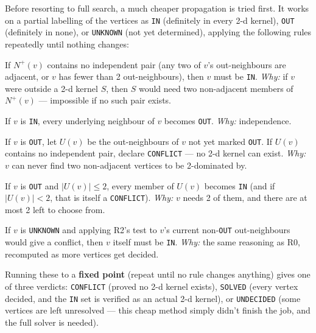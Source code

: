 \documentclass[11pt]{article}
\theoremstyle{plain}
\theoremstyle{definition}
\theoremstyle{remark}
\begin{document}
Before resorting to full search, a much cheaper propagation is tried first. It works
on a partial labelling of the vertices as \texttt{IN} (definitely in every 2-d kernel),
\texttt{OUT} (definitely in none), or \texttt{UNKNOWN} (not yet determined), applying
the following rules repeatedly until nothing changes:

\begin{description}[nosep,leftmargin=2.3cm,style=nextline]
\item[R0 (forced-in)] If $N^+(v)$ contains no independent pair (any two of $v$'s
out-neighbours are adjacent, or $v$ has fewer than 2 out-neighbours), then $v$ must be
\texttt{IN}. \emph{Why:} if $v$ were outside a 2-d kernel $S$, then $S$ would need two
non-adjacent members of $N^+(v)$ — impossible if no such pair exists.
\item[R1 (spread-out)] If $v$ is \texttt{IN}, every underlying neighbour of $v$ becomes
\texttt{OUT}. \emph{Why:} independence.
\item[R2 (conflict-check)] If $v$ is \texttt{OUT}, let $U(v)$ be the out-neighbours of
$v$ not yet marked \texttt{OUT}. If $U(v)$ contains no independent pair, declare
\texttt{CONFLICT} — no 2-d kernel can exist. \emph{Why:} $v$ can never find two
non-adjacent vertices to be 2-dominated by.
\item[R3 (forced-in by scarcity)] If $v$ is \texttt{OUT} and $|U(v)| \le 2$, every
member of $U(v)$ becomes \texttt{IN} (and if $|U(v)| < 2$, that is itself a
\texttt{CONFLICT}). \emph{Why:} $v$ needs 2 of them, and there are at most 2 left to
choose from.
\item[R4 (forced-in by the same test, on the fly)] If $v$ is \texttt{UNKNOWN} and
applying R2's test to $v$'s current non-\texttt{OUT} out-neighbours would give a
conflict, then $v$ itself must be \texttt{IN}. \emph{Why:} the same reasoning as R0,
recomputed as more vertices get decided.
\end{description}

Running these to a \textbf{fixed point} (repeat until no rule changes anything) gives
one of three verdicts: \texttt{CONFLICT} (proved no 2-d kernel exists), \texttt{SOLVED}
(every vertex decided, and the \texttt{IN} set is verified as an actual 2-d kernel), or
\texttt{UNDECIDED} (some vertices are left unresolved — this cheap method simply
didn't finish the job, and the full solver is needed).
\end{document}
